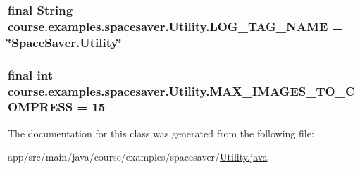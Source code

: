 \subsubsection[{L\+O\+G\+\_\+\+T\+A\+G\+\_\+\+N\+A\+M\+E}]{\setlength{\rightskip}{0pt plus 5cm}final String course.\+examples.\+spacesaver.\+Utility.\+L\+O\+G\+\_\+\+T\+A\+G\+\_\+\+N\+A\+M\+E = \char`\"{}Space\+Saver.\+Utility\char`\"{}\hspace{0.3cm}{\ttfamily [static]}}\label{classcourse_1_1examples_1_1spacesaver_1_1_utility_a306cf6f2267973d242405123fc51c775}
\hypertarget{classcourse_1_1examples_1_1spacesaver_1_1_utility_a8953f2c1e57838e6e76c22071b4e5a02}{}
\subsubsection[{M\+A\+X\+\_\+\+I\+M\+A\+G\+E\+S\+\_\+\+T\+O\+\_\+\+C\+O\+M\+P\+R\+E\+S\+S}]{\setlength{\rightskip}{0pt plus 5cm}final int course.\+examples.\+spacesaver.\+Utility.\+M\+A\+X\+\_\+\+I\+M\+A\+G\+E\+S\+\_\+\+T\+O\+\_\+\+C\+O\+M\+P\+R\+E\+S\+S = 15\hspace{0.3cm}{\ttfamily [static]}}\label{classcourse_1_1examples_1_1spacesaver_1_1_utility_a8953f2c1e57838e6e76c22071b4e5a02}


The documentation for this class was generated from the following file\+:\begin{DoxyCompactItemize}
\item 
app/src/main/java/course/examples/spacesaver/\hyperlink{_utility_8java}{Utility.\+java}\end{DoxyCompactItemize}
